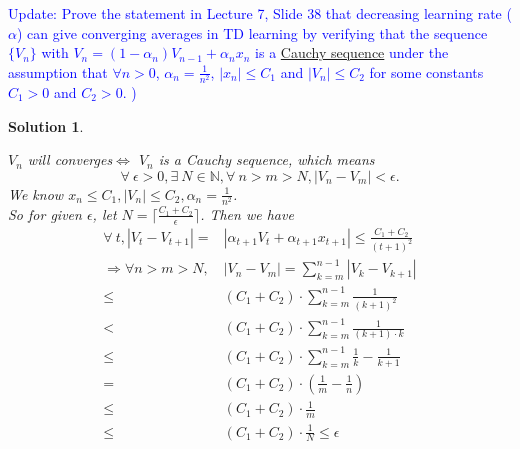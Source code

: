 \documentclass{article}
\newtheorem*{Solution}{Solution}
\newcommand{\mytextcolor}[1]{\textcolor{blue}{{}#1}}
\begin{document}
\begin{enumerate}
\begin{enumerate}
    	    \mytextcolor{Update: 
    	     Prove the statement in Lecture 7, Slide 38 that decreasing learning rate ($\alpha$) can give converging averages in TD learning by verifying that the sequence $\{V_n\}$ with $V_n=(1-\alpha_n)V_{n-1}+\alpha_n x_n$ is a \href{https://en.wikipedia.org/wiki/Cauchy_sequence}{Cauchy sequence}
    	    under the assumption that $\forall n>0$, $\alpha_n=\frac{1}{n^2}$, $|x_n|\leq C_1$ and $|V_n|\leq C_2$ for some constants $C_1>0$ and $C_2>0$. )
    	    }
    	    \begin{Solution}~\par
    	    $V_n$ will converges$\Leftrightarrow$ $V_n$ is a Cauchy sequence, which means 
    	    \begin{equation}
    	        \forall~\epsilon>0,\exists~N\in\mathbb{N}, \forall~n>m>N, |V_{n}-V_{m}|<\epsilon.
    	    \end{equation}
    	    We know $x_n\le C_1,|V_n|\le C_2, \alpha_n=\frac{1}{n^2}$.\\
    	    So for given $\epsilon$, let $N=\lceil\frac{C_1+C_2}{\epsilon}\rceil$.
    	    Then we have
    	    \begin{equation}
    	        \begin{aligned}
    	            \forall~t,|V_t-V_{t+1}|=&|\alpha_{t+1}V_{t}+\alpha_{t+1}x_{t+1}|\le \frac{C_1+C_2}{(t+1)^2}\\
    	            \Rightarrow\forall n>m>N, &|V_n-V_m|=\sum_{k=m}^{n-1}|V_k-V_{k+1}|\\
    	        \le&(C_1+C_2)\cdot\sum_{k=m}^{n-1}\frac{1}{(k+1)^2}\\
    	        <&(C_1+C_2)\cdot\sum_{k=m}^{n-1}\frac{1}{(k+1)\cdot k}\\
    	        \le&(C_1+C_2)\cdot\sum_{k=m}^{n-1}\frac{1}{k}-\frac{1}{k+1}\\
    	        =&(C_1+C_2)\cdot(\frac{1}{m}-\frac{1}{n})\\
    	        \le&(C_1+C_2)\cdot\frac{1}{m}\\
    	        \le&(C_1+C_2)\cdot\frac{1}{N}\le\epsilon
    	        \end{aligned}
    	    \end{equation}
    	    \end{Solution}
    \end{enumerate}


\end{enumerate}
\end{document}
